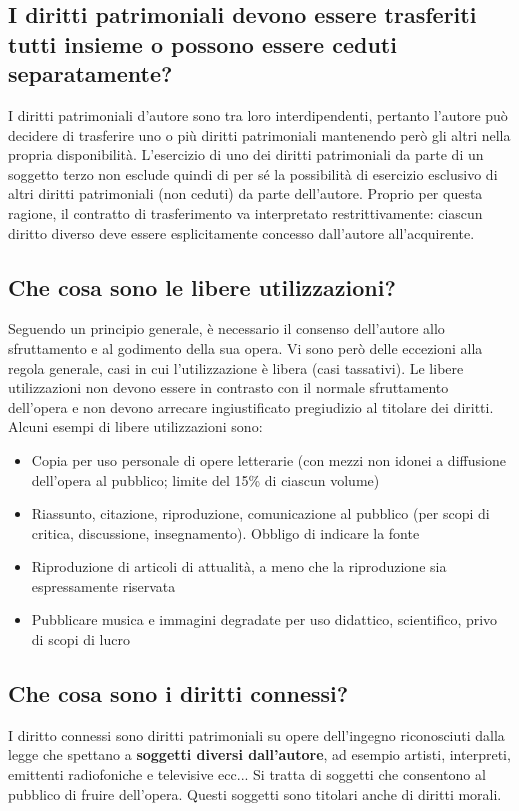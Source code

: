 \subsection{I diritti patrimoniali devono essere trasferiti tutti insieme o possono essere ceduti separatamente?}
I diritti patrimoniali d’autore sono tra loro interdipendenti, pertanto l’autore può decidere di trasferire uno
o più diritti patrimoniali mantenendo però gli altri nella propria disponibilità. L’esercizio di uno dei diritti patrimoniali
da parte di un soggetto terzo non esclude quindi di per sé la possibilità di esercizio esclusivo di altri diritti
patrimoniali (non ceduti) da parte dell’autore. Proprio per questa ragione, il contratto di trasferimento va interpretato
restrittivamente: ciascun diritto diverso deve essere esplicitamente concesso dall'autore all’acquirente.

\subsection{Che cosa sono le libere utilizzazioni?}
Seguendo un principio generale, è necessario il consenso dell'autore allo sfruttamento e al godimento della sua opera. \newline
Vi sono però delle eccezioni alla regola generale, casi in cui l'utilizzazione è libera (casi tassativi).\newline
Le libere utilizzazioni non devono essere in contrasto con il normale sfruttamento dell'opera e non devono arrecare
ingiustificato pregiudizio al titolare dei diritti.\newline
Alcuni esempi di libere utilizzazioni sono:
\begin{itemize}
    \item Copia per uso personale di opere letterarie (con mezzi non idonei a diffusione dell'opera al pubblico;
    limite del 15\% di ciascun volume)
    \item Riassunto, citazione, riproduzione, comunicazione al pubblico (per scopi di critica, discussione, insegnamento).
    Obbligo di indicare la fonte
    \item Riproduzione di articoli di attualità, a meno che la riproduzione sia espressamente riservata
    \item Pubblicare musica e immagini degradate per uso didattico, scientifico, privo di scopi di lucro
\end{itemize}

\subsection{Che cosa sono i diritti connessi?}
I diritto connessi sono diritti patrimoniali su opere dell'ingegno riconosciuti dalla legge che spettano a \textbf{soggetti diversi
dall'autore}, ad esempio artisti, interpreti, emittenti radiofoniche e televisive ecc... \newline
Si tratta di soggetti che consentono al pubblico di fruire dell'opera. Questi soggetti sono titolari anche di diritti morali.

